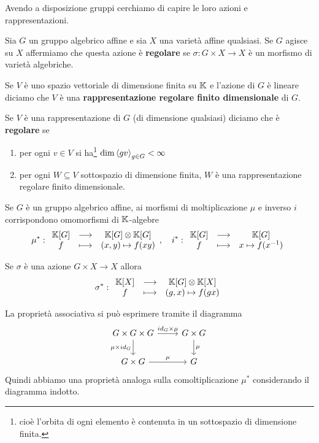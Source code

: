 Avendo a disposizione gruppi cerchiamo di capire le loro azioni e rappresentazioni.

\begin{definition}
Sia $G$ un gruppo algebrico affine e sia $X$ una variet\`a affine qualsiasi. Se $G$ agisce su $X$ affermiamo che questa azione \`e \textbf{regolare} se $\sigma:G\times X\to X$ \`e un morfismo di variet\`a algebriche.
\end{definition}

\begin{definition}
Se $V$ \`e uno spazio vettoriale di dimensione finita su $\mathbb{K}$ e l'azione di $G$ \`e lineare diciamo che $V$ \`e una \textbf{rappresentazione regolare finito dimensionale} di $G$.

Se $V$ \`e una rappresentazione di $G$ (di dimensione qualsiasi) diciamo che \`e \textbf{regolare} se
\begin{enumerate}
    \item per ogni $v\in V$ si ha\footnote{cio\`e l'orbita di ogni elemento \`e contenuta in un sottospazio di dimensione finita.} $\dim\left\langle {gv}\right\rangle_{g\in G}<\infty$
    \item per ogni $W\subseteq V$ sottospazio di dimensione finita, $W$ \`e una rappresentazione regolare finito dimensionale.
\end{enumerate}
\end{definition}


\begin{remark}
Se $G$ \`e un gruppo algebrico affine, ai morfismi di moltiplicazione $\mu$ e inverso $i$ corrispondono omomorfismi di $\mathbb{K}$-algebre
\[\mu^\ast:\begin{array}{ccc} {\mathbb{K}[G]} & \longrightarrow & {\mathbb{K}[G]\otimes\mathbb{K}[G]}\\ {f} & \longmapsto & {(x,y)\mapsto f(xy)} \end{array},\quad i^\ast:\begin{array}{ccc} {\mathbb{K}[G]} & \longrightarrow & {\mathbb{K}[G]}\\ {f} & \longmapsto & {x\mapsto f(x^{-1})} \end{array}\]
\end{remark}

\begin{remark}
Se $\sigma$ \`e una azione $G\times X\to X$ allora
\[\sigma^\ast:\begin{array}{ccc} {\mathbb{K}[X]} & \longrightarrow & {\mathbb{K}[G]\otimes\mathbb{K}[X]}\\ {f} & \longmapsto & {(g,x)\mapsto f(gx)} \end{array}\]
\end{remark}


\begin{remark}
La propriet\`a associativa si pu\`o esprimere tramite il diagramma
\[\begin{tikzcd}
	{G\times G\times G} & {G\times G} \\
	{G\times G} & G
	\arrow["{id_G\times\mu}", from=1-1, to=1-2]
	\arrow["{\mu\times id_G}"', from=1-1, to=2-1]
	\arrow["\mu", from=1-2, to=2-2]
	\arrow["\mu", from=2-1, to=2-2]
\end{tikzcd}\]
Quindi abbiamo una propriet\`a analoga sulla comoltiplicazione $\mu^\ast$ considerando il diagramma indotto.
\end{remark}

